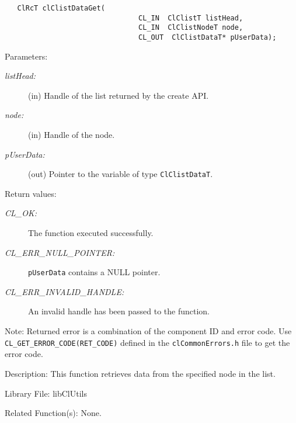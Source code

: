 \begin{flushleft}
\begin{Desc}
\footnotesize\begin{verbatim}   ClRcT clClistDataGet(
                     			CL_IN  ClClistT listHead,
                     			CL_IN  ClClistNodeT node,
                     			CL_OUT  ClClistDataT* pUserData);
\end{verbatim}
\normalsize
\end{Desc}
\begin{Desc}
\item[Parameters:]
\begin{description}
\item[{\em list\-Head:}](in) Handle of the list returned by the create API. 
\item[{\em node:}](in) Handle of the node. 
\item[{\em p\-User\-Data:}](out) Pointer to the variable of type {\tt{Cl\-Clist\-Data\-T}}.\end{description}
\end{Desc}
\begin{Desc}
\item[Return values:]
\begin{description}
\item[{\em CL\_\-OK:}]The function executed successfully. \item[{\em CL\_\-ERR\_\-NULL\_\-POINTER:}]{\tt{pUserData}} contains a NULL pointer. 
\item[{\em CL\_\-ERR\_\-INVALID\_\-HANDLE:}]An invalid handle has been passed to the function.\end{description}
\end{Desc}
\begin{Desc}
\item[Note:]Returned error is a combination of the component ID and error code. Use {\tt{CL\_\-GET\_\-ERROR\_\-CODE(RET\_\-CODE)}} defined in 
the {\tt{clCommonErrors.h}} file to get the error code.\end{Desc}
\begin{Desc}
\item[Description:]This function retrieves data from the specified node in the list.\end{Desc}
\begin{Desc}
\item[Library File:]lib\-Cl\-Utils\end{Desc}
\begin{Desc}
\item[Related Function(s):]None. \end{Desc}
\newpage



\end{flushleft}
